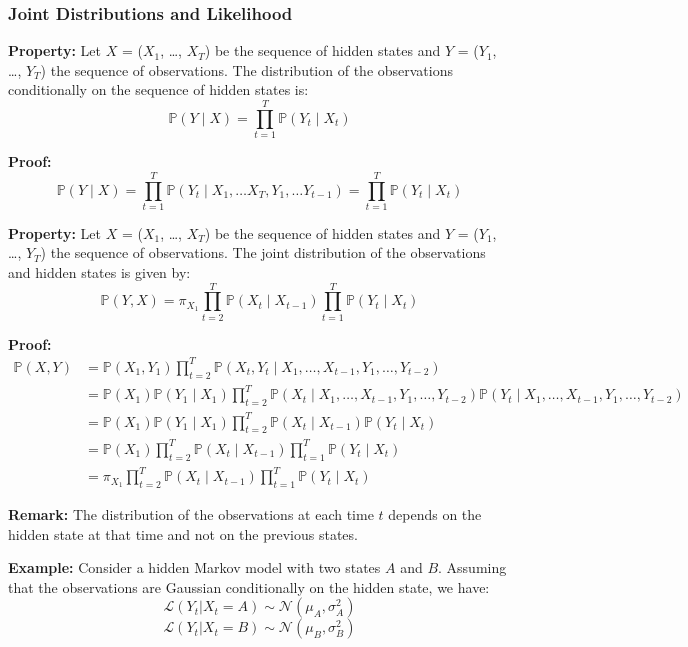 \documentclass[11pt]{article}
\begin{document}
\subsubsection{Joint Distributions and Likelihood}

\textbf{Property:}
Let $X$ = ($X_1$, \dots, $X_T$) be the sequence of hidden states and $Y$ = ($Y_1$, \dots, $Y_T$) the sequence of observations. The distribution of the observations conditionally on the sequence of hidden states is: 
\[
\mathbb{P}(Y \mid X) = \prod_{t=1}^T \mathbb{P}(Y_t \mid X_t) 
\]

\textbf{Proof:}
\[
\mathbb{P}(Y \mid X) = \prod_{t=1}^T \mathbb{P}(Y_t \mid X_1, \dots X_T,Y_1, \dots Y_{t-1})=\prod_{t=1}^T \mathbb{P}(Y_t \mid X_t)  
\]
\vspace{0.3cm}

\textbf{Property:}
Let $X$ = ($X_1$, \dots, $X_T$) be the sequence of hidden states and $Y$ = ($Y_1$, \dots, $Y_T$) the sequence of observations. The joint distribution of the observations and hidden states is given by: 
\[
\mathbb{P}(Y, X) = \pi_{X_1} \prod_{t=2}^T \mathbb{P}(X_{t} \mid X_{t-1}) \prod_{t=1}^T \mathbb{P}(Y_t \mid X_t)
\]

\textbf{Proof:}
\begin{align*}
\mathbb{P}(X, Y) 
&= \mathbb{P}(X_1, Y_1) \prod_{t=2}^T \mathbb{P}(X_t,Y_t \mid X_1, \dots, X_{t-1}, Y_1,\dots, Y_{t-2}) \\
&= \mathbb{P}(X_1)\mathbb{P}(Y_1 \mid X_1) 
\prod_{t=2}^T \mathbb{P}(X_t \mid X_1, \dots, X_{t-1}, Y_1,\dots, Y_{t-2})
\mathbb{P}(Y_t \mid X_1, \dots, X_{t-1}, Y_1,\dots, Y_{t-2}) \\
&= \mathbb{P}(X_1)\mathbb{P}(Y_1 \mid X_1) 
\prod_{t=2}^T \mathbb{P}(X_t \mid X_{t-1}) \mathbb{P}(Y_t \mid X_t) \\
&= \mathbb{P}(X_1) \prod_{t=2}^T \mathbb{P}(X_t \mid X_{t-1}) \prod_{t=1}^T \mathbb{P}(Y_t \mid X_t) \\
&= \pi_{X_1} \prod_{t=2}^T \mathbb{P}(X_t \mid X_{t-1}) \prod_{t=1}^T \mathbb{P}(Y_t \mid X_t)
\end{align*}
\vspace{0.3cm}

\textbf{Remark:}
The distribution of the observations at each time $t$ depends on the hidden state at that time and not on the previous states. 
\vspace{0.3cm}

\textbf{Example:}
Consider a hidden Markov model with two states $A$ and $B$. 
Assuming that the observations are Gaussian conditionally on the hidden state, we have:
\[
\mathcal{L}(Y_t | {X_t=A}) \sim \mathcal{N}(\mu_{A}, \sigma^2_{A})
\]
\[
\mathcal{L}(Y_t | {X_t=B}) \sim \mathcal{N}(\mu_{B}, \sigma^2_{B})
\]
\vspace{0.3cm}
\end{document}
